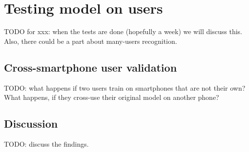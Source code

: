 
\section{Testing model on users}

TODO for xxx: when the tests are done (hopefully a week) we will discuss this. Also, there could be a part about many-users recognition.

\subsection{Cross-smartphone user validation}
TODO: what happens if two users train on smartphones that are not their own? What happens, if they cross-use their original model on another phone?

\subsection{Discussion}
TODO: discuss the findings.